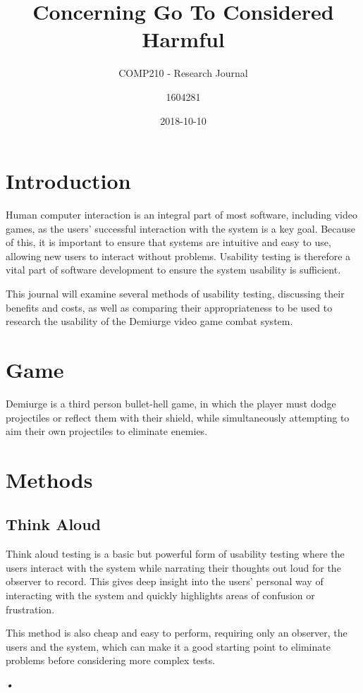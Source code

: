 \documentclass{scrartcl}
\title{Concerning Go To Considered Harmful}
\subtitle{COMP210 - Research Journal}
\date{2018-10-10}
\author{1604281}
\begin{document}
\maketitle
{}


\section{Introduction}
Human computer interaction is an integral part of most software, including video games, as the users' successful interaction with the system is a key goal. Because of this, it is important to ensure that systems are intuitive and easy to use, allowing new users to interact without problems. Usability testing is therefore a vital part of software development to ensure the system usability is sufficient. 

This journal will examine several methods of usability testing, discussing their benefits and costs, as well as comparing their appropriateness to be used to research the usability of the Demiurge video game combat system.

\section{Game}
Demiurge is a third person bullet-hell game, in which the player must dodge projectiles or reflect them with their shield, while simultaneously attempting to aim their own projectiles to eliminate enemies.


\section{Methods}

\subsection{Think Aloud}
Think aloud testing is a basic but powerful form of usability testing where the users interact with the system while narrating their thoughts out loud for the observer to record. This gives deep insight into the users' personal way of interacting with the system and quickly highlights areas of confusion or frustration.

This method is also cheap and easy to perform, requiring only an observer, the users and the system, which can make it a good starting point to eliminate problems before considering more complex tests.

\textsl{•}
\end{document}
